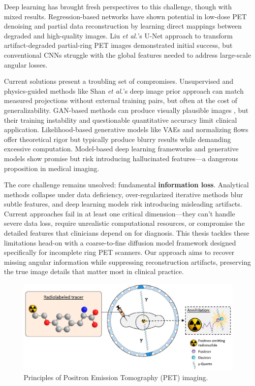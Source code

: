 \documentclass[
reprint,
superscriptaddress,
nofootinbib,
amsmath,amssymb,
aps,
prd,
]{revtex4-2}
\begin{document}
Deep learning has brought fresh perspectives to this challenge, though with mixed results. Regression-based networks have shown potential in low-dose PET denoising and partial data reconstruction \cite{Kandarpa_2021} by learning direct mappings between degraded and high-quality images. Liu \textit{et al.}'s U-Net approach to transform artifact-degraded partial-ring PET images \cite{liu2019} demonstrated initial success, but conventional CNNs struggle with the global features needed to address large-scale angular losses. 

Current solutions present a troubling set of compromises. Unsupervised and physics-guided methods like Shan \textit{et al.}'s deep image prior approach \cite{shan2024} can match measured projections without external training pairs, but often at the cost of generalizability. GAN-based methods can produce visually plausible images \cite{xue2023cg3dsrganclassificationguided3d}, but their training instability and questionable quantitative accuracy limit clinical application. Likelihood-based generative models like VAEs and normalizing flows offer theoretical rigor but typically produce blurry results while demanding excessive computation. Model-based deep learning frameworks and generative models \cite{reader2023, vashistha2024} show promise but risk introducing hallucinated features—a dangerous proposition in medical imaging.

The core challenge remains unsolved: fundamental \textbf{information loss}. Analytical methods collapse under data deficiency, over-regularized iterative methods blur subtle features, and deep learning models risk introducing misleading artifacts. Current approaches fail in at least one critical dimension—they can't handle severe data loss, require unrealistic computational resources, or compromise the detailed features that clinicians depend on for diagnosis. This thesis tackles these limitations head-on with a coarse-to-fine diffusion model framework designed specifically for incomplete ring PET scanners. Our approach aims to recover missing angular information while suppressing reconstruction artifacts, preserving the true image details that matter most in clinical practice.

\begin{figure}[htbp]
	\centering
	\includegraphics[scale=0.47]{./Images/graph.jpg}
	\caption{Principles of Positron Emission Tomography (PET) imaging.}
	\label{fig:graph}
\end{figure}
\end{document}
